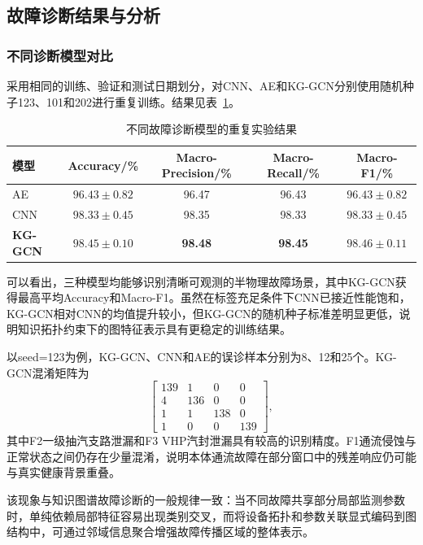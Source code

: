 \subsection{故障诊断结果与分析}
\label{subsec:diagnosis_results_v3}

\subsubsection{不同诊断模型对比}

采用相同的训练、验证和测试日期划分，对CNN、AE和KG-GCN分别使用随机种子123、101和202进行重复训练。结果见表~\ref{tab:main_result_v3}。

\begin{table}[htbp]
    \centering
    \caption{不同故障诊断模型的重复实验结果}
    \label{tab:main_result_v3}
    \begin{tabular}{lcccc}
        \toprule
        模型 & Accuracy/\% & Macro-Precision/\% & Macro-Recall/\% & Macro-F1/\% \\
        \midrule
        AE & $96.43\pm0.82$ & 96.47 & 96.43 & $96.43\pm0.82$ \\
        CNN & $98.33\pm0.45$ & 98.35 & 98.33 & $98.33\pm0.45$ \\
        \textbf{KG-GCN} & $\mathbf{98.45\pm0.10}$ & \textbf{98.48} & \textbf{98.45} & $\mathbf{98.46\pm0.11}$ \\
        \bottomrule
    \end{tabular}
\end{table}

可以看出，三种模型均能够识别清晰可观测的半物理故障场景，其中KG-GCN获得最高平均Accuracy和Macro-F1。虽然在标签充足条件下CNN已接近性能饱和，KG-GCN相对CNN的均值提升较小，但KG-GCN的随机种子标准差明显更低，说明知识拓扑约束下的图特征表示具有更稳定的训练结果。

以seed=123为例，KG-GCN、CNN和AE的误诊样本分别为8、12和25个。KG-GCN混淆矩阵为
\begin{equation}
\begin{bmatrix}
139&1&0&0\\
4&136&0&0\\
1&1&138&0\\
1&0&0&139
\end{bmatrix},
\end{equation}
其中F2一级抽汽支路泄漏和F3 VHP汽封泄漏具有较高的识别精度。F1通流侵蚀与正常状态之间仍存在少量混淆，说明本体通流故障在部分窗口中的残差响应仍可能与真实健康背景重叠。

该现象与知识图谱故障诊断的一般规律一致：当不同故障共享部分局部监测参数时，单纯依赖局部特征容易出现类别交叉，而将设备拓扑和参数关联显式编码到图结构中，可通过邻域信息聚合增强故障传播区域的整体表示\cite{YangHaodong2026CFB}。

